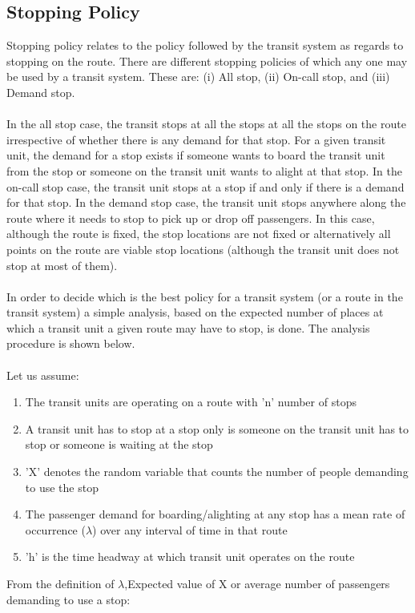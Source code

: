 \subsection{Stopping Policy}
Stopping policy relates to the policy followed by the transit system as regards to stopping on the route. There are different stopping policies of which any one may be used by a transit system. These are: (i) All stop, (ii) On-call stop, and (iii) Demand stop.\\\\
In the all stop case, the transit stops at all the stops at all the stops on the route irrespective of whether there is any demand for that stop. For a given transit unit, the demand for a stop exists if someone wants to board the transit unit from the stop or someone on the transit unit wants to alight at that stop. In the on-call stop case, the transit unit stops at a stop if and only if there is a demand for that stop. In the demand stop case, the transit unit stops anywhere along the route where it needs to stop to pick up or drop off passengers. In this case, although the route is fixed, the stop locations are not fixed or alternatively all points on the route are viable stop locations (although the transit unit does not stop at most of them).\\\\
In order to decide which is the best policy for a transit system (or a route in the transit system) a simple analysis, based on the expected number of places at which a transit unit a given route may have to stop, is done. The analysis procedure is shown below.\\\\
Let us assume:
\begin{enumerate}
	\item The transit units are operating on a route with 'n' number of stops
	\item A transit unit has to stop at a stop only is someone on the transit unit has to stop or someone is waiting at the stop
	\item 'X' denotes the random variable that counts the number of people demanding to use the stop
	\item The passenger demand for boarding/alighting at any stop has a mean rate of occurrence ($ \lambda $) over any interval of time in that route 
	\item 'h' is the time headway at which transit unit operates on the route
\end{enumerate}
From the definition of $ \lambda $,Expected value of X or average number of passengers demanding to use a stop:

